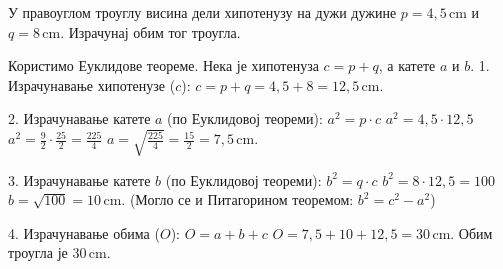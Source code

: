 \documentclass[10pt,a5paper,addpoints,answers]{exam}
\def\measure#1#2{#1 \, \mathrm{#2}}
\begin{document}
\begin{questions}
\question[4]
 У правоуглом троуглу висина дели хипотенузу на дужи дужине
 $p = \measure{4{,}5}{cm}$ и $q = \measure{8}{cm}$.
 Израчунај обим тог троугла.
 \begin{solution}[\stretch 9] %
  Користимо Еуклидове теореме. Нека је хипотенуза $c = p+q$, а катете $a$ и $b$.
  1. Израчунавање хипотенузе ($c$):
  $c = p + q = 4{,}5 + 8 = \measure{12{,}5}{cm}$.

  2. Израчунавање катете $a$ (по Еуклидовој теореми):
  $a^2 = p \cdot c$
  $a^2 = 4{,}5 \cdot 12{,}5$
  $a^2 = \frac{9}{2} \cdot \frac{25}{2} = \frac{225}{4}$
  $a = \sqrt{\frac{225}{4}} = \frac{15}{2} = \measure{7{,}5}{cm}$.

  3. Израчунавање катете $b$ (по Еуклидовој теореми):
  $b^2 = q \cdot c$
  $b^2 = 8 \cdot 12{,}5 = 100$
  $b = \sqrt{100} = \measure{10}{cm}$.
  (Могло се и Питагорином теоремом: $b^2 = c^2 - a^2$)

  4. Израчунавање обима ($O$):
  $O = a + b + c$
  $O = 7{,}5 + 10 + 12{,}5 = \measure{30}{cm}$.
  Обим троугла је $\measure{30}{cm}$.
 \end{solution}
 \answerline

\end{questions}

\end{document}

